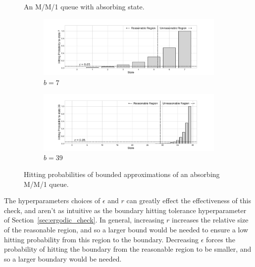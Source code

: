 \documentclass{article}
\begin{document}
\begin{figure}

\caption{An M/M/1 queue with absorbing state.}
\label{fig:mm1_absorbing}
\end{figure}

\begin{figure}[!htbp]
  \begin{center}
  \begin{subfigure}[b]{0.65\textwidth}
    \includegraphics[width=\textwidth]{img/example_absorbingmc_8states.pdf}
    \caption{$b=7$}
    \label{fig:absorbing_b7}
  \end{subfigure}
  \begin{subfigure}[b]{0.65\textwidth}
    \includegraphics[width=\textwidth]{img/example_absorbingmc_40states.pdf}
    \caption{$b=39$}
    \label{fig:absorbing_b39}
  \end{subfigure}
  \end{center}
  \caption{Hitting probabilities of bounded approximations of an absorbing
  M/M/1 queue.}
  \label{fig:absorbing_check}
\end{figure}



The hyperparameters choices of $\epsilon$ and $r$ can greatly effect the
effectiveness of this check, and aren't as intuitive as the boundary hitting
tolerance hyperparameter of Section~\ref{sec:ergodic_check}. In general,
increasing $r$ increases the relative size of the reasonable region, and so a
larger bound would be needed to ensure a low hitting probability from this
region to the boundary. Decreasing $\epsilon$ forces the probability of hitting
the boundary from the reasonable region to be smaller, and so a larger boundary
would be needed.
\end{document}
